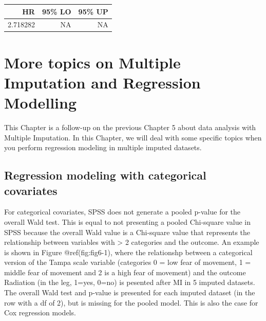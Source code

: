 \documentclass[
]{book}
\begin{document}
\begin{tabular}{r|r|r}
\hline
HR & 95\% LO & 95\% UP\\
\hline
2.718282 & NA & NA\\
\hline
\end{tabular}

\hypertarget{more-topics-on-multiple-imputation-and-regression-modelling}{%
\chapter{More topics on Multiple Imputation and Regression
Modelling}\label{more-topics-on-multiple-imputation-and-regression-modelling}}

This Chapter is a follow-up on the previous Chapter 5 about data
analysis with Multiple Imputation. In this Chapter, we will deal with
some specific topics when you perform regression modeling in multiple
imputed datasets.

\hypertarget{regression-modeling-with-categorical-covariates}{%
\section{Regression modeling with categorical
covariates}\label{regression-modeling-with-categorical-covariates}}

For categorical covariates, SPSS does not generate a pooled p-value for
the overall Wald test. This is equal to not presenting a pooled
Chi-square value in SPSS because the overall Wald value is a Chi-square
value that represents the relationship between variables with
\textgreater{} 2 categories and the outcome. An example is shown in
Figure @ref(fig:fig6-1), where the relationshp between a categorical
version of the Tampa scale variable (categories 0 = low fear of
movement, 1 = middle fear of movement and 2 is a high fear of movement)
and the outcome Radiation (in the leg, 1=yes, 0=no) is pesented after MI
in 5 imputed datasets. The overall Wald test and p-value is presented
for each imputed dataset (in the row with a df of 2), but is missing for
the pooled model. This is also the case for Cox regression models.
\end{document}
